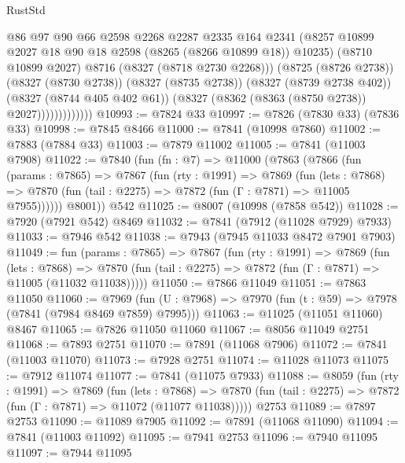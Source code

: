 \begin{lexlean}{RustStd}
\begin{coremodule}
                            @86
                            @97
                            @90
                            @66
                            @2598
                            @2268
                            @2287
                            @2335
                            @164
                            @2341
                            (@8257 @10899 @2027 @18 @90 @18 @2598 (@8265 (@8266 @10899 @18)) @10235)
                            (@8710 @10899 @2027)
                            @8716
                            (@8327 (@8718 @2730 @2268)))
                          (@8725 (@8726 @2738))
                          (@8327 (@8730 @2738))
                          (@8327 (@8735 @2738))
                          (@8327 (@8739 @2738 @402))
                          (@8327 (@8744 @405 @402 @61))
                          (@8327 (@8362 (@8363 (@8750 @2738)) @2027)))))))))))))
@10993 := @7824 @33
@10997 := @7826 (@7830 @33) (@7836 @33)
@10998 := @7845 @8466
@11000 := @7841 (@10998 @7860)
@11002 := @7883 (@7884 @33)
@11003 := @7879 @11002
@11005 := @7841 (@11003 @7908)
@11022 := @7840
    (fun (fn : @7) =>
    @11000
      (@7863
        (@7866
          (fun (params : @7865) =>
          @7867
            (fun (rty : @1991) =>
            @7869
              (fun (lets : @7868) =>
              @7870 (fun (tail : @2275) => @7872 (fun (Γ : @7871) => @11005 @7955))))))
        @8001))
    @542
@11025 := @8007 (@10998 (@7858 @542))
@11028 := @7920 (@7921 @542) @8469
@11032 := @7841 (@7912 (@11028 @7929) @7933)
@11033 := @7946 @542
@11038 := @7943 (@7945 @11033 @8472 @7901 @7903)
@11049 := fun (params : @7865) =>
  @7867
    (fun (rty : @1991) =>
    @7869
      (fun (lets : @7868) =>
      @7870 (fun (tail : @2275) => @7872 (fun (Γ : @7871) => @11005 (@11032 @11038)))))
@11050 := @7866 @11049
@11051 := @7863 @11050
@11060 := @7969
    (fun (U : @7968) => @7970 (fun (t : @59) => @7978 (@7841 (@7984 @8469 @7859) @7995)))
@11063 := @11025 (@11051 @11060) @8467
@11065 := @7826 @11050 @11060
@11067 := @8056 @11049 @2751
@11068 := @7893 @2751
@11070 := @7891 (@11068 @7906)
@11072 := @7841 (@11003 @11070)
@11073 := @7928 @2751
@11074 := @11028 @11073
@11075 := @7912 @11074
@11077 := @7841 (@11075 @7933)
@11088 := @8059
    (fun (rty : @1991) =>
    @7869
      (fun (lets : @7868) =>
      @7870 (fun (tail : @2275) => @7872 (fun (Γ : @7871) => @11072 (@11077 @11038)))))
    @2753
@11089 := @7897 @2753
@11090 := @11089 @7905
@11092 := @7891 (@11068 @11090)
@11094 := @7841 (@11003 @11092)
@11095 := @7941 @2753
@11096 := @7940 @11095
@11097 := @7944 @11095

\end{coremodule}
\end{lexlean}
